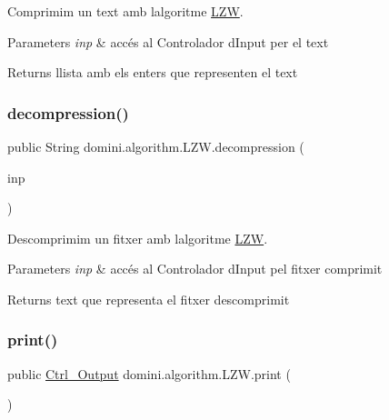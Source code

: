 Comprimim un text amb l\textquotesingle{}algoritme \hyperlink{classdomini_1_1algorithm_1_1LZW}{L\+ZW}. 


\begin{DoxyParams}{Parameters}
{\em inp} & accés al Controlador d\textquotesingle{}Input per el text \\
\hline
\end{DoxyParams}
\begin{DoxyReturn}{Returns}
llista amb els enters que representen el text 
\end{DoxyReturn}
\mbox{\label{classdomini_1_1algorithm_1_1LZW_a1c7f66a62ed475a72a49f294c41f54fa}} 
\subsubsection{\texorpdfstring{decompression()}{decompression()}}
{\footnotesize\ttfamily public String domini.\+algorithm.\+L\+Z\+W.\+decompression (\begin{DoxyParamCaption}\item[{\hyperlink{classpersistencia_1_1input_1_1Ctrl__Input__LZW}{Ctrl\+\_\+\+Input\+\_\+\+L\+ZW}}]{inp }\end{DoxyParamCaption})\hspace{0.3cm}{\ttfamily [inline]}}



Descomprimim un fitxer amb l\textquotesingle{}algoritme \hyperlink{classdomini_1_1algorithm_1_1LZW}{L\+ZW}. 


\begin{DoxyParams}{Parameters}
{\em inp} & accés al Controlador d\textquotesingle{}Input pel fitxer comprimit \\
\hline
\end{DoxyParams}
\begin{DoxyReturn}{Returns}
text que representa el fitxer descomprimit 
\end{DoxyReturn}
\mbox{\label{classdomini_1_1algorithm_1_1LZW_a57ba5129e7f26d4cc066195e3d6c9c8c}} 
\subsubsection{\texorpdfstring{print()}{print()}}
{\footnotesize\ttfamily public \hyperlink{classpersistencia_1_1output_1_1Ctrl__Output}{Ctrl\+\_\+\+Output} domini.\+algorithm.\+L\+Z\+W.\+print (\begin{DoxyParamCaption}{ }\end{DoxyParamCaption})\hspace{0.3cm}{\ttfamily [inline]}}



